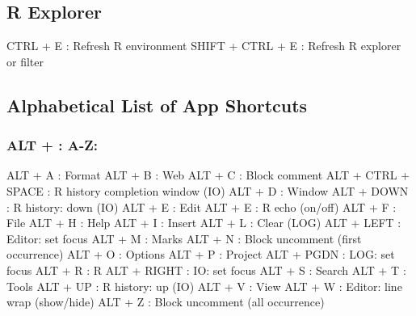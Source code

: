 \hypertarget{basic_card_rexplorer}{}
\subsection{R Explorer}

\vspace{-0.5cm}
\begin{Rtables}[caption={[R explorer keyboard shortcuts]
    R explorer keyboard shortcuts},
  label=shortcut:rexplorer]
  CTRL  + E        : Refresh R environment
  SHIFT + CTRL + E : Refresh R explorer or filter
\end{Rtables}


\newpage
\hypertarget{basic_card_alphabetical}{}
\subsection{Alphabetical List of App Shortcuts}


\subsubsection{ALT + : A-Z:}

\vspace{-0.5cm}
\begin{Rtables}[caption={[ALT keyboard shortcuts]
    ALT Keyboard Shortcuts},
  label=shortcut:alt]
  ALT + A            : Format
  ALT + B            : Web
  ALT + C            : Block comment
  ALT + CTRL + SPACE : R history completion window (IO)
  ALT + D            : Window
  ALT + DOWN         : R history: down (IO)
  ALT + E            : Edit
  ALT + E            : R echo (on/off)
  ALT + F            : File
  ALT + H            : Help
  ALT + I            : Insert
  ALT + L            : Clear (LOG)
  ALT + LEFT         : Editor: set focus
  ALT + M            : Marks
  ALT + N            : Block uncomment (first occurrence)
  ALT + O            : Options
  ALT + P            : Project
  ALT + PGDN         : LOG: set focus
  ALT + R            : R
  ALT + RIGHT        : IO: set focus
  ALT + S            : Search
  ALT + T            : Tools
  ALT + UP           : R history: up (IO)
  ALT + V            : View
  ALT + W            : Editor: line wrap (show/hide)
  ALT + Z            : Block uncomment (all occurrence)
\end{Rtables}


